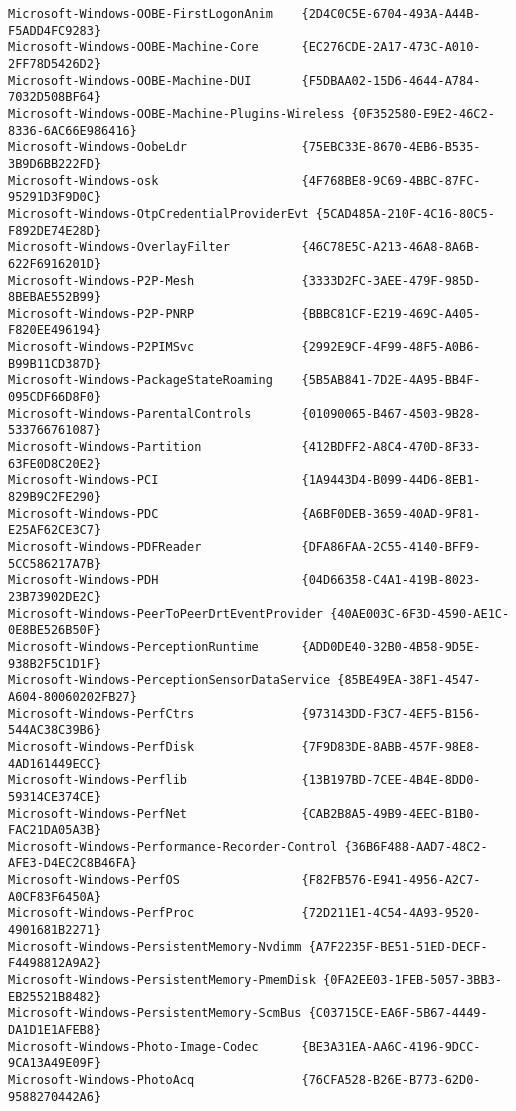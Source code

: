 \documentclass{report}
\begin{document}
\begin{lstlisting}[breaklines=true,basicstyle=\tiny]
Microsoft-Windows-OOBE-FirstLogonAnim    {2D4C0C5E-6704-493A-A44B-F5ADD4FC9283}
Microsoft-Windows-OOBE-Machine-Core      {EC276CDE-2A17-473C-A010-2FF78D5426D2}
Microsoft-Windows-OOBE-Machine-DUI       {F5DBAA02-15D6-4644-A784-7032D508BF64}
Microsoft-Windows-OOBE-Machine-Plugins-Wireless {0F352580-E9E2-46C2-8336-6AC66E986416}
Microsoft-Windows-OobeLdr                {75EBC33E-8670-4EB6-B535-3B9D6BB222FD}
Microsoft-Windows-osk                    {4F768BE8-9C69-4BBC-87FC-95291D3F9D0C}
Microsoft-Windows-OtpCredentialProviderEvt {5CAD485A-210F-4C16-80C5-F892DE74E28D}
Microsoft-Windows-OverlayFilter          {46C78E5C-A213-46A8-8A6B-622F6916201D}
Microsoft-Windows-P2P-Mesh               {3333D2FC-3AEE-479F-985D-8BEBAE552B99}
Microsoft-Windows-P2P-PNRP               {BBBC81CF-E219-469C-A405-F820EE496194}
Microsoft-Windows-P2PIMSvc               {2992E9CF-4F99-48F5-A0B6-B99B11CD387D}
Microsoft-Windows-PackageStateRoaming    {5B5AB841-7D2E-4A95-BB4F-095CDF66D8F0}
Microsoft-Windows-ParentalControls       {01090065-B467-4503-9B28-533766761087}
Microsoft-Windows-Partition              {412BDFF2-A8C4-470D-8F33-63FE0D8C20E2}
Microsoft-Windows-PCI                    {1A9443D4-B099-44D6-8EB1-829B9C2FE290}
Microsoft-Windows-PDC                    {A6BF0DEB-3659-40AD-9F81-E25AF62CE3C7}
Microsoft-Windows-PDFReader              {DFA86FAA-2C55-4140-BFF9-5CC586217A7B}
Microsoft-Windows-PDH                    {04D66358-C4A1-419B-8023-23B73902DE2C}
Microsoft-Windows-PeerToPeerDrtEventProvider {40AE003C-6F3D-4590-AE1C-0E8BE526B50F}
Microsoft-Windows-PerceptionRuntime      {ADD0DE40-32B0-4B58-9D5E-938B2F5C1D1F}
Microsoft-Windows-PerceptionSensorDataService {85BE49EA-38F1-4547-A604-80060202FB27}
Microsoft-Windows-PerfCtrs               {973143DD-F3C7-4EF5-B156-544AC38C39B6}
Microsoft-Windows-PerfDisk               {7F9D83DE-8ABB-457F-98E8-4AD161449ECC}
Microsoft-Windows-Perflib                {13B197BD-7CEE-4B4E-8DD0-59314CE374CE}
Microsoft-Windows-PerfNet                {CAB2B8A5-49B9-4EEC-B1B0-FAC21DA05A3B}
Microsoft-Windows-Performance-Recorder-Control {36B6F488-AAD7-48C2-AFE3-D4EC2C8B46FA}
Microsoft-Windows-PerfOS                 {F82FB576-E941-4956-A2C7-A0CF83F6450A}
Microsoft-Windows-PerfProc               {72D211E1-4C54-4A93-9520-4901681B2271}
Microsoft-Windows-PersistentMemory-Nvdimm {A7F2235F-BE51-51ED-DECF-F4498812A9A2}
Microsoft-Windows-PersistentMemory-PmemDisk {0FA2EE03-1FEB-5057-3BB3-EB25521B8482}
Microsoft-Windows-PersistentMemory-ScmBus {C03715CE-EA6F-5B67-4449-DA1D1E1AFEB8}
Microsoft-Windows-Photo-Image-Codec      {BE3A31EA-AA6C-4196-9DCC-9CA13A49E09F}
Microsoft-Windows-PhotoAcq               {76CFA528-B26E-B773-62D0-9588270442A6}

\end{lstlisting}
\end{document}
